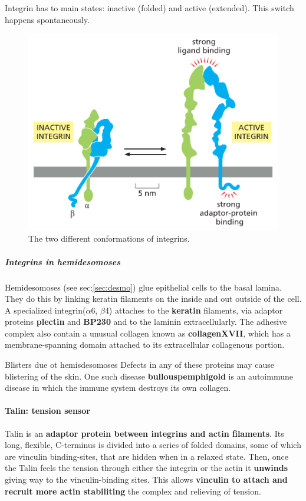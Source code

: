 \documentclass[../main.tex]{subfiles}
\begin{document}
Integrin has to main states: inactive (folded) and active (extended). This switch happens spontaneously.
\begin{figure}[H]
	\centering
	\includegraphics[width=0.6\linewidth]{int_conf}
	\caption{The two different conformations of integrins.}
	\label{fig:intconf}
\end{figure}


\subparagraph{Integrins in hemidesomoses}

Hemidesomoses (see sec:\ref{sec:desmo}) glue epithelial cells to the basal lamina. They do this by linking keratin filaments on the inside and out outside of the cell. A specialized integrin($\alpha$6, $\beta$4) attaches to the \textbf{keratin} filaments, via adaptor proteins \textbf{\gls{plectin}} and \textbf{\gls{BP230}} and to the laminin extracellularly. The adhesive complex also contain a unusual collagen known as \textbf{\gls{collagenXVII}}, which has a membrane-spanning domain attached to its extracellular collagenous portion.

\begin{RemarkWithTitel}{Blisters due ot hemisdesomoses}
	Defects in any of these proteins may cause blistering of the skin. One such disease \textbf{\gls{bullouspemphigold}} is an autoimmune disease in which the immune system destroys its own collagen.
\end{RemarkWithTitel}


\paragraph{Talin: tension sensor}

\gls{Talin} is an \textbf{adaptor protein between integrins and actin filaments}. Its long, flexible, C-terminus is divided into a series of folded domains, some of which are vinculin binding-sites, that are hidden when in a relaxed state. Then, once the Talin feels the tension through either the integrin or the actin it \textbf{unwinds} giving way to the vinculin-binding sites. This allows \textbf{vinculin to attach and recruit more actin stabiliting} the complex and relieving of tension.
\end{document}
